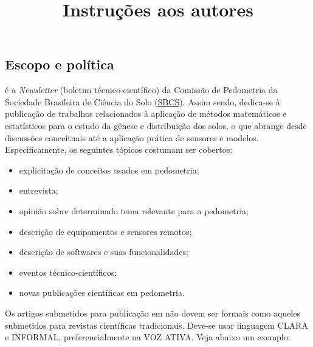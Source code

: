 ﻿\title{Instruções aos autores}
\maketitle

\subsection{Escopo e política}

\pedometria é a \textit{Newsletter} (boletim técnico-científico) da Comissão de Pedometria da Sociedade Brasileira de Ciência do Solo (\href{http://www.sbcs.org.br/}{SBCS}). Assim sendo, dedica-se à publicação de trabalhos relacionados à aplicação de métodos matemáticos e estatísticos para o estudo da gênese e distribuição dos solos, o que abrange desde discussões conceituais até a aplicação prática de sensores e modelos. Especificamente, os seguintes tópicos costumam ser cobertos:

\begin{itemize}
 \item explicitação de conceitos usados em pedometria;
 \item entrevista;
 \item opinião sobre determinado tema relevante para a pedometria;
 \item descrição de equipamentos e sensores remotos;
 \item descrição de softwares e suas funcionalidades;
 \item eventos técnico-científicos;
 \item novas publicações científicas em pedometria.
\end{itemize}

Os artigos submetidos para publicação em \pedometria não devem ser formais como aqueles submetidos para revistas científicas tradicionais. Deve-se usar linguagem CLARA e INFORMAL, preferencialmente na VOZ ATIVA. Veja abaixo um exemplo:

